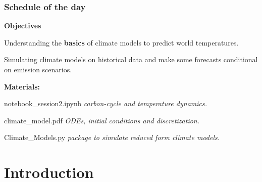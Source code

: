 \documentclass[xcolor=x11names,compress,aspectratio=169]{beamer}%
\makeatletter
\renewenvironment{itemize}{\begin{compactitemize}[<+-| alert@+>]}{\end{compactitemize}}
\makeatother
\begin{document}
\begin{frame}%
%

\frametitle{Schedule of the day}%


\textbf{Objectives}

\begin{itemize}
\item Understanding the \textbf{basics} of climate models to predict world temperatures.

\item Simulating climate models on historical data and make some forecasts
conditional on emission scenarios.%
\vspace{1ex}%

\end{itemize}

\textbf{Materials:}

\begin{itemize}
\item \textsf{notebook\_session2.ipynb} \textit{carbon-cycle and temperature dynamics.}

\item \textsf{climate\_model.pdf} \textit{ODEs, initial conditions and discretization.}

\item \textsf{Climate\_Models.py}\textit{ package to simulate reduced form
climate models.}
\end{itemize}

%

\transboxout
\end{frame}%


\section{Introduction}%
\end{document}
